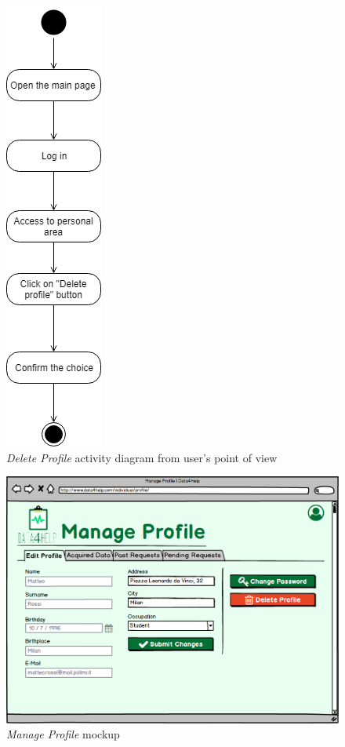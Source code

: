\begin{figure}[H]
\begin{center}
  \includegraphics[height=0.6\paperheight]{img/activity/DeleteProfile.png}
  \hspace{0.05\linewidth}
  \centering
  \caption{\textit{Delete Profile} activity diagram from user's point of view}
  \label{img:deleteProfileActivityDiagram}
\end{center}
\end{figure}

\begin{figure}[H]
\begin{center}
  \includegraphics[width=\textwidth]{img/mockup/Manage_Profile.png}
  \hspace{0.05\linewidth}
  \centering
  \caption{\textit{Manage Profile} mockup}
  \label{img:manageProfileMockup}
\end{center}
\end{figure}
